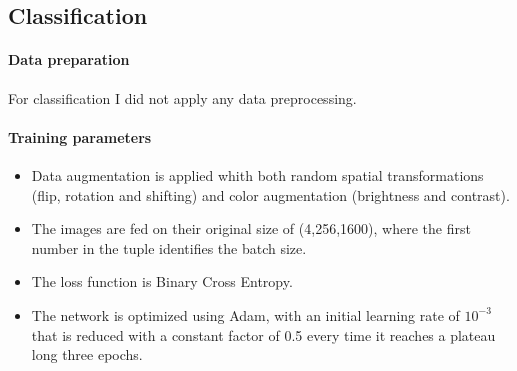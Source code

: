 \documentclass[10pt,twocolumn,letterpaper]{article}
\begin{document}
   \subsection{Classification}
      \paragraph{Data preparation} 
         For classification I did not apply any data preprocessing.
                 
      \paragraph{Training parameters}
      \begin{itemize}
         \item Data augmentation is applied whith both random spatial transformations (flip, rotation and shifting) and color augmentation (brightness and contrast).
         \item The images are fed on their original size of (4,256,1600), where the first number in the tuple identifies the batch size.
         \item The loss function is Binary Cross Entropy. 
         \item The network is optimized using Adam, with an initial learning rate of $ 10^{-3} $ that is reduced with a constant factor of 0.5 every time it reaches a plateau long three epochs.
      \end{itemize}
\end{document}
